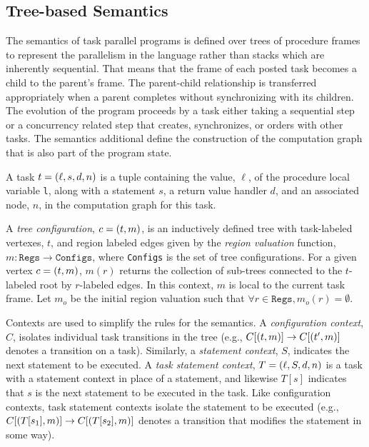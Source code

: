 \subsection{Tree-based Semantics}

The semantics of task parallel programs is defined over trees of
procedure frames to represent the parallelism in the language rather
than stacks which are inherently sequential.  That means that the
frame of each posted task becomes a child to the parent's frame. The
parent-child relationship is transferred appropriately when a parent
completes without synchronizing with its children.  The evolution of
the program proceeds by a task either taking a sequential step or a
concurrency related step that creates, synchronizes, or orders with
other tasks.  The semantics additional define the construction of the
computation graph that is also part of the program state.

A task $t = \left( \ell, s, d, n \right)$ is a tuple containing the value,
$\ell$, of the procedure local variable \texttt{l}, along with a
statement $s$, a return value handler $d$, and an associated node,
$n$, in the computation graph for this task.

A \emph{tree configuration}, $c = \left( t,m \right)$, is an inductively
defined tree with task-labeled vertexes, $t$, and region labeled edges
given by the \emph{region valuation} function, $m : \texttt{Regs}
\rightarrow \texttt{Configs}$, where \texttt{Configs} is the set of
tree configurations.  For a given vertex $c = \left( t,m \right)$, $m(r)$
returns the collection of sub-trees connected to the $t$-labeled root
by $r$-labeled edges. In this context, $m$ is local to the current
task frame. Let $m_o$ be the initial region valuation such that
$\forall r \in \mathtt{Regs}, m_o(r) = \emptyset$.

Contexts are used to simplify the rules for the semantics. A
\emph{configuration context}, $C$, isolates individual task
transitions in the tree (e.g., $C[\left( t,m \right)] \rightarrow
C[\left( t^\prime,m \right)]$ denotes a transition on a
task). Similarly, a \emph{statement context}, $S$, indicates the next
statement to be executed.  A \emph{task statement context}, $T =
\left( \ell, S, d, n \right)$ is a task with a statement context in place of
a statement, and likewise $T[s]$ indicates that $s$ is the next
statement to be executed in the task. Like configuration contexts,
task statement contexts isolate the statement to be executed (e.g.,
$C[\left( T[s_1],m \right)] \rightarrow C[\left( T[s_2],m \right)]$ denotes a transition that modifies the statement in some way).

